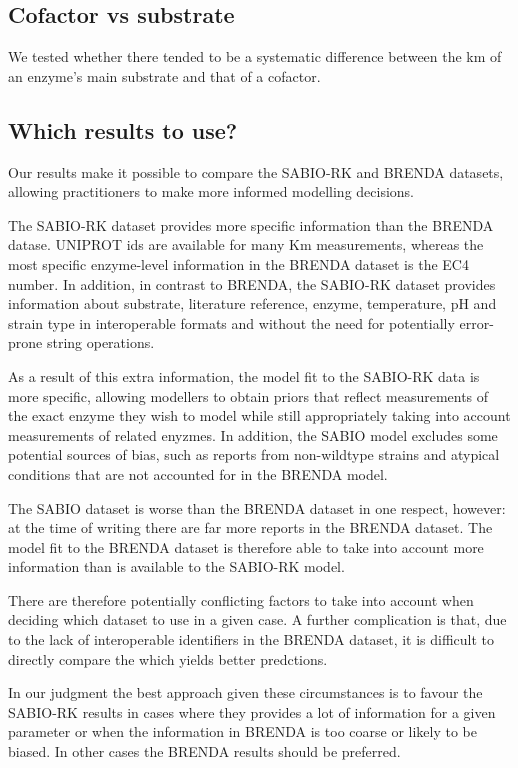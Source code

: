 \documentclass[11pt]{article}
\begin{document}
\subsection{Cofactor vs substrate}
\label{sec:orgf252161}
We tested whether there tended to be a systematic difference between the km of
an enzyme's main substrate and that of a cofactor. 

\subsection{Which results to use?}
\label{sec:orgb07a856}

Our results make it possible to compare the SABIO-RK and BRENDA datasets,
allowing practitioners to make more informed modelling decisions.

The SABIO-RK dataset provides more specific information than the BRENDA
datase. UNIPROT ids are available for many Km measurements, whereas the most
specific enzyme-level information in the BRENDA dataset is the EC4 number. In
addition, in contrast to BRENDA, the SABIO-RK dataset provides information about
substrate, literature reference, enzyme, temperature, pH and strain type in
interoperable formats and without the need for potentially error-prone string
operations.

As a result of this extra information, the model fit to the SABIO-RK data is
more specific, allowing modellers to obtain priors that reflect measurements of
the exact enzyme they wish to model while still appropriately taking into
account measurements of related enyzmes. In addition, the SABIO model excludes
some potential sources of bias, such as reports from non-wildtype strains and
atypical conditions that are not accounted for in the BRENDA model.

The SABIO dataset is worse than the BRENDA dataset in one respect, however: at
the time of writing there are far more reports in the BRENDA dataset. The model
fit to the BRENDA dataset is therefore able to take into account more
information than is available to the SABIO-RK model.

There are therefore potentially conflicting factors to take into account when
deciding which dataset to use in a given case. A further complication is that,
due to the lack of interoperable identifiers in the BRENDA dataset, it is
difficult to directly compare the which yields better predctions.

In our judgment the best approach given these circumstances is to favour the
SABIO-RK results in cases where they provides a lot of information for a given
parameter or when the information in BRENDA is too coarse or likely to be
biased. In other cases the BRENDA results should be preferred.
\end{document}
